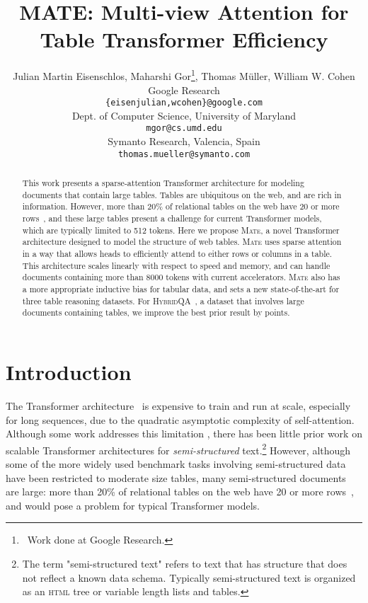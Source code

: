 \documentclass[11pt]{article}
\title{MATE: Multi-view Attention for Table Transformer Efficiency}
\author{
Julian Martin Eisenschlos,
Maharshi Gor\thanks{\,\,\,Work done at Google Research.},
Thomas M{\"u}ller\footnotemark[1],
William W. Cohen\\
Google Research \\
\texttt{\{eisenjulian,wcohen\}@google.com}\\
Dept. of Computer Science, University of Maryland \\
\texttt{mgor@cs.umd.edu}\\
Symanto Research, Valencia, Spain \\
\texttt{thomas.mueller@symanto.com}
}
\newcommand{\abr}[1]{\textsc{#1}}
\newcommand\hqa{\textsc{HybridQA}\xspace}
\newcommand{\model}{\textsc{Mate}\xspace}
\begin{document}
\newtheorem{theorem}{Theorem}
\newtheorem*{theorem*}{Theorem}
\newtheorem{lemma}[theorem]{Lemma}

\maketitle

\begin{abstract}
    This work presents a sparse-attention Transformer architecture for modeling documents that contain large tables.
Tables are ubiquitous on the web, and are rich in information. However,
more than 20\% of relational tables on the web have 20 or more rows~\cite{cafarella-2008-relweb}, and these large tables present a challenge for current Transformer models, which are typically limited to 512 tokens.
Here we propose \model, a novel Transformer architecture designed to model the structure of web tables. \model uses sparse attention in a way that allows heads to efficiently attend to either rows or columns in a table.
This architecture scales linearly with respect to speed and memory, and can handle documents containing more than 8000 tokens with current accelerators.
\model also has a more appropriate inductive bias for tabular data, and sets a new state-of-the-art for three table reasoning datasets.
For \hqa~\cite{chen-etal-2020-hybridqa}, a dataset that involves large documents containing tables, we improve the best prior result by  points.
 \end{abstract}

\section{Introduction}
\label{sec:intro}

The Transformer architecture~\cite{vaswani17} is expensive to train and run at scale, especially for long sequences, due to the quadratic asymptotic complexity of self-attention.  Although some work addresses this limitation \cite{ainslie-etal-2020-etc, kitaev2020reformer, zaheer2020bigbird}, there has been little prior work
on scalable Transformer architectures for \emph{semi-structured} text.\footnote{The term "semi-structured text" refers to text that has structure that does not reflect a known data schema.  Typically semi-structured text is organized as an \abr{html} tree or variable length lists and tables.}  However, although some of the more widely used benchmark tasks involving semi-structured data have been restricted to moderate size tables, many semi-structured documents are large: more than 20\% of relational tables on the web have 20 or more rows~\cite{cafarella-2008-relweb}, and would pose a problem for typical Transformer models.
\end{document}
